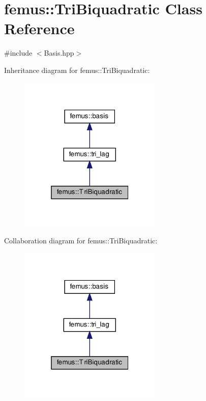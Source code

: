 \hypertarget{classfemus_1_1_tri_biquadratic}{}\section{femus\+:\+:Tri\+Biquadratic Class Reference}
\label{classfemus_1_1_tri_biquadratic}


{\ttfamily \#include $<$Basis.\+hpp$>$}



Inheritance diagram for femus\+:\+:Tri\+Biquadratic\+:
\nopagebreak
\begin{figure}[H]
\begin{center}
\leavevmode
\includegraphics[width=193pt]{classfemus_1_1_tri_biquadratic__inherit__graph}
\end{center}
\end{figure}


Collaboration diagram for femus\+:\+:Tri\+Biquadratic\+:
\nopagebreak
\begin{figure}[H]
\begin{center}
\leavevmode
\includegraphics[width=193pt]{classfemus_1_1_tri_biquadratic__coll__graph}
\end{center}
\end{figure}
